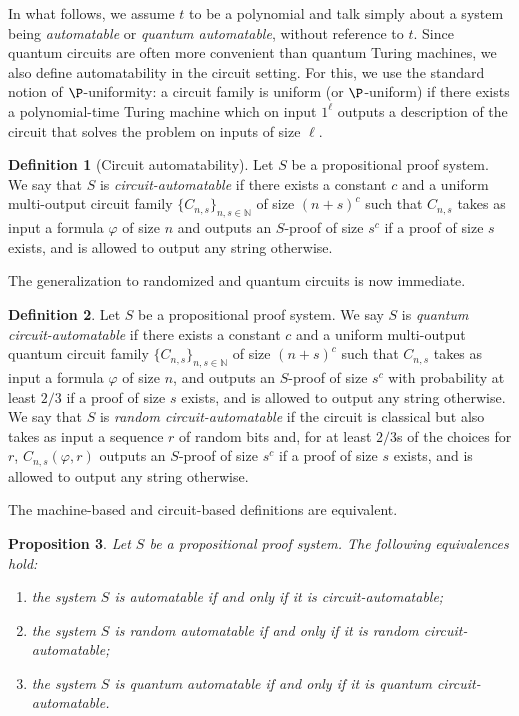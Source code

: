 \documentclass[11pt]{article}
\theoremstyle{definition}
\newtheorem{definition}{Definition}[section]
\theoremstyle{plain}
\newtheorem{proposition}[definition]{Proposition}
\theoremstyle{remark}
\newcommand{\bN}{\mathbb{N}}
\begin{document}
In what follows, we assume $t$ to be a polynomial and talk simply about a system being \emph{automatable} or \emph{quantum automatable}, without reference to $t$. Since quantum circuits are often more convenient than quantum Turing machines, we also define automatability in the circuit setting. For this, we use the standard notion of $\P$-uniformity: a circuit family is uniform (or $\P$-uniform) if there exists a polynomial-time Turing machine which on input $1^\ell$ outputs a description of the circuit that solves the problem on inputs of size $\ell$.


\begin{definition}[Circuit automatability]
\label{def:circ-aut}
Let $S$ be a propositional proof system. We say that $S$ is \emph{circuit-automatable} if there exists a constant $c$ and a uniform multi-output circuit family $\{ C_{n, s}\}_{n, s\in \bN}$ of size $(n + s)^c$ such that $C_{n, s}$ takes as input a formula $\varphi$ of size $n$ and outputs an $S$-proof of size $s^c$ if a proof of size $s$ exists, and is allowed to output any string otherwise.
\end{definition}

The generalization to randomized and quantum circuits is now immediate.

\begin{definition}
\label{def:q-cir-aut}
Let $S$ be a propositional proof system. We say $S$ is \emph{quantum circuit-automatable} if there exists a constant $c$ and a uniform multi-output quantum circuit family $\{ C_{n, s}\}_{n, s\in \bN}$ of size $(n+s)^c$ such that $C_{n, s}$ takes as input a formula $\varphi$ of size $n$, and outputs an $S$-proof of size $s^c$ with probability at least $2/3$ if a proof of size $s$ exists, and is allowed to output any string otherwise. We say that $S$ is \emph{random circuit-automatable} if the circuit is classical but also takes as input a sequence $r$ of random bits and, for at least $2/3$s of the choices for $r$, $C_{n,s}(\varphi, r)$ outputs an $S$-proof of size $s^c$ if a proof of size $s$ exists, and is allowed to output any string otherwise.
\end{definition}

The machine-based and circuit-based definitions are equivalent.

\begin{proposition}
\label{prop:equivalences}
Let $S$ be a propositional proof system. The following equivalences hold:
    \begin{enumerate}
        \item[(i)] the system $S$ is automatable if and only if it is circuit-automatable;
        \item[(ii)] the system $S$ is random automatable if and only if it is random circuit-automatable;
        \item[(iii)] the system $S$ is quantum automatable if and only if it is quantum circuit-automatable.
    \end{enumerate}
\end{proposition}
\end{document}
